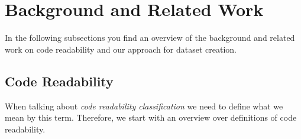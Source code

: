 \documentclass[%
class=scrreprt,
chapterprefix=false,%
open=right,%
twoside=false,%
paper=a4,%
logofile={Logo\_zentral\_farbig\_EN.png},%
thesistype=master,%
UKenglish,%
]{se2thesis}
\theoremstyle{definition}
\begin{document}
\section{Background and Related Work} \label{Background and Related Work}
	In the following subsections you find an overview of the background and related work on code readability and our approach for dataset creation.
	
\subsection{Code Readability} \label{Code Readability}
		
	
	

	
	When talking about \textit{code readability classification} we need to define what we mean by this term. Therefore, we start with an overview over definitions of code readability.
	
\end{document}

